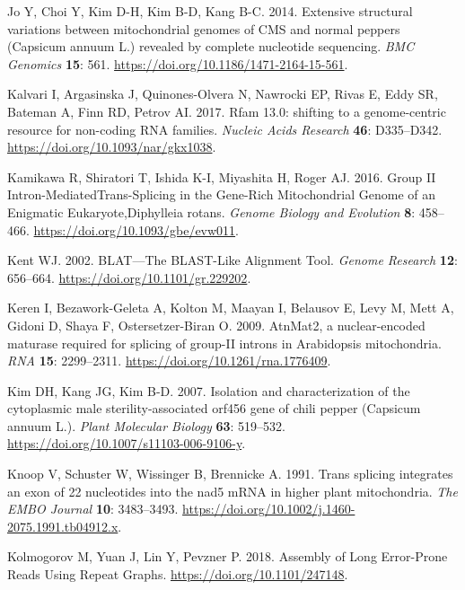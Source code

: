 \documentclass[
  12pt,
  oneside,
  openany]{book}
\begin{document}
\leavevmode\hypertarget{ref-Jo_2014}{}%
Jo Y, Choi Y, Kim D-H, Kim B-D, Kang B-C. 2014. Extensive structural variations between mitochondrial genomes of CMS and normal peppers (Capsicum annuum L.) revealed by complete nucleotide sequencing. \emph{BMC Genomics} \textbf{15}: 561. \url{https://doi.org/10.1186/1471-2164-15-561}.

\leavevmode\hypertarget{ref-Kalvari_2017}{}%
Kalvari I, Argasinska J, Quinones-Olvera N, Nawrocki EP, Rivas E, Eddy SR, Bateman A, Finn RD, Petrov AI. 2017. Rfam 13.0: shifting to a genome-centric resource for non-coding RNA families. \emph{Nucleic Acids Research} \textbf{46}: D335--D342. \url{https://doi.org/10.1093/nar/gkx1038}.

\leavevmode\hypertarget{ref-Kamikawa_2016}{}%
Kamikawa R, Shiratori T, Ishida K-I, Miyashita H, Roger AJ. 2016. Group II Intron-MediatedTrans-Splicing in the Gene-Rich Mitochondrial Genome of an Enigmatic Eukaryote,Diphylleia rotans. \emph{Genome Biology and Evolution} \textbf{8}: 458--466. \url{https://doi.org/10.1093/gbe/evw011}.

\leavevmode\hypertarget{ref-Kent_2002}{}%
Kent WJ. 2002. BLAT---The BLAST-Like Alignment Tool. \emph{Genome Research} \textbf{12}: 656--664. \url{https://doi.org/10.1101/gr.229202}.

\leavevmode\hypertarget{ref-Keren_2009}{}%
Keren I, Bezawork-Geleta A, Kolton M, Maayan I, Belausov E, Levy M, Mett A, Gidoni D, Shaya F, Ostersetzer-Biran O. 2009. AtnMat2, a nuclear-encoded maturase required for splicing of group-II introns in Arabidopsis mitochondria. \emph{RNA} \textbf{15}: 2299--2311. \url{https://doi.org/10.1261/rna.1776409}.

\leavevmode\hypertarget{ref-Kim_2007}{}%
Kim DH, Kang JG, Kim B-D. 2007. Isolation and characterization of the cytoplasmic male sterility-associated orf456 gene of chili pepper (Capsicum annuum L.). \emph{Plant Molecular Biology} \textbf{63}: 519--532. \url{https://doi.org/10.1007/s11103-006-9106-y}.

\leavevmode\hypertarget{ref-Knoop_1991}{}%
Knoop V, Schuster W, Wissinger B, Brennicke A. 1991. Trans splicing integrates an exon of 22 nucleotides into the nad5 mRNA in higher plant mitochondria. \emph{The EMBO Journal} \textbf{10}: 3483--3493. \url{https://doi.org/10.1002/j.1460-2075.1991.tb04912.x}.

\leavevmode\hypertarget{ref-Kolmogorov_2018}{}%
Kolmogorov M, Yuan J, Lin Y, Pevzner P. 2018. Assembly of Long Error-Prone Reads Using Repeat Graphs. \url{https://doi.org/10.1101/247148}.
\end{document}

